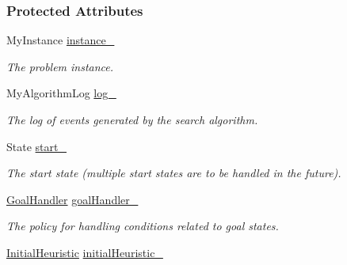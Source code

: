 \subsubsection*{Protected Attributes}
\begin{DoxyCompactItemize}
\item 
My\+Instance \hyperlink{structalgorithm_1_1Algorithm_a1a5383360e58b9f299f2e4f23d9261af}{instance\+\_\+}\hypertarget{structalgorithm_1_1Algorithm_a1a5383360e58b9f299f2e4f23d9261af}{}\label{structalgorithm_1_1Algorithm_a1a5383360e58b9f299f2e4f23d9261af}

\begin{DoxyCompactList}\small\item\em The problem instance. \end{DoxyCompactList}\item 
My\+Algorithm\+Log \hyperlink{structalgorithm_1_1Algorithm_adfbeae4f5a72307228b54c4cf28e5e40}{log\+\_\+}\hypertarget{structalgorithm_1_1Algorithm_adfbeae4f5a72307228b54c4cf28e5e40}{}\label{structalgorithm_1_1Algorithm_adfbeae4f5a72307228b54c4cf28e5e40}

\begin{DoxyCompactList}\small\item\em The log of events generated by the search algorithm. \end{DoxyCompactList}\item 
State \hyperlink{structalgorithm_1_1Algorithm_aeca9a4a018cc8229cbcfee80b6127860}{start\+\_\+}\hypertarget{structalgorithm_1_1Algorithm_aeca9a4a018cc8229cbcfee80b6127860}{}\label{structalgorithm_1_1Algorithm_aeca9a4a018cc8229cbcfee80b6127860}

\begin{DoxyCompactList}\small\item\em The start state (multiple start states are to be handled in the future). \end{DoxyCompactList}\item 
\hyperlink{structalgorithm_1_1Algorithm_af9111b0a505a193a2c4878b710b8ea65}{Goal\+Handler} \hyperlink{structalgorithm_1_1Algorithm_a3117a85e8d077232aa65567c9060f1a8}{goal\+Handler\+\_\+}\hypertarget{structalgorithm_1_1Algorithm_a3117a85e8d077232aa65567c9060f1a8}{}\label{structalgorithm_1_1Algorithm_a3117a85e8d077232aa65567c9060f1a8}

\begin{DoxyCompactList}\small\item\em The policy for handling conditions related to goal states. \end{DoxyCompactList}\item 
\hyperlink{structalgorithm_1_1Algorithm_aa0c111908e844c0ff5cfe78f778bba52}{Initial\+Heuristic} \hyperlink{structalgorithm_1_1Algorithm_a5eab4fa992d98013d12be09848cd44f9}{initial\+Heuristic\+\_\+}\hypertarget{structalgorithm_1_1Algorithm_a5eab4fa992d98013d12be09848cd44f9}{}\label{structalgorithm_1_1Algorithm_a5eab4fa992d98013d12be09848cd44f9}


\end{DoxyCompactItemize}
